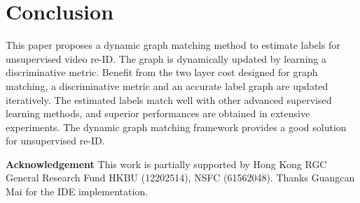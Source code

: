 \documentclass[10pt,twocolumn,letterpaper]{article}
\begin{document}
\section{Conclusion}
This paper proposes a dynamic graph matching method to estimate labels for unsupervised video re-ID. The graph is dynamically updated by learning a discriminative metric. Benefit from the two layer cost designed for graph matching, a discriminative metric and an accurate label graph are updated iteratively. The estimated labels match well with other advanced supervised learning methods, and superior performances are obtained in extensive experiments. The dynamic graph matching framework provides a good solution for unsupervised re-ID.

\textbf{Acknowledgement} This work is partially supported by Hong Kong RGC General Research Fund HKBU (12202514), NSFC (61562048). Thanks Guangcan Mai for the IDE implementation.

{\small


}
\end{document}
